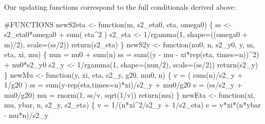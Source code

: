\documentclass[]{article}
\newenvironment{Shaded}{\begin{snugshade}}{\end{snugshade}}
\newcommand{\KeywordTok}[1]{\textcolor[rgb]{0.94,0.87,0.69}{{#1}}}
\newcommand{\DataTypeTok}[1]{\textcolor[rgb]{0.87,0.87,0.75}{{#1}}}
\newcommand{\DecValTok}[1]{\textcolor[rgb]{0.86,0.86,0.80}{{#1}}}
\newcommand{\StringTok}[1]{\textcolor[rgb]{0.80,0.58,0.58}{{#1}}}
\newcommand{\CommentTok}[1]{\textcolor[rgb]{0.50,0.62,0.50}{{#1}}}
\newcommand{\NormalTok}[1]{\textcolor[rgb]{0.80,0.80,0.80}{{#1}}}
\begin{document}
Our updating functions correspond to the full conditionals derived
above:

\begin{Shaded}
\begin{Highlighting}[]
\CommentTok{#FUNCTIONS}
\NormalTok{newS2eta <-}\StringTok{ }\NormalTok{function(m, s2_eta0, eta, omega0)}
\NormalTok{\{}
  \NormalTok{ss <-}\StringTok{ }\NormalTok{s2_eta0*omega0 +}\StringTok{ }\KeywordTok{sum}\NormalTok{( eta^}\DecValTok{2} \NormalTok{)}
  \NormalTok{s2_eta <-}\StringTok{ }\DecValTok{1}\NormalTok{/}\KeywordTok{rgamma}\NormalTok{(}\DecValTok{1}\NormalTok{, }\DataTypeTok{shape=}\NormalTok{((omega0 +}\StringTok{ }\NormalTok{m)/}\DecValTok{2}\NormalTok{), }\DataTypeTok{scale=}\NormalTok{(ss/}\DecValTok{2}\NormalTok{))}
  \KeywordTok{return}\NormalTok{(s2_eta)}
\NormalTok{\}}
\NormalTok{newS2y <-}\StringTok{ }\NormalTok{function(nu0, n, s2_y0, y, m, eta, xi, mu)}
\NormalTok{\{}
  \NormalTok{nun =}\StringTok{ }\NormalTok{nu0 +}\StringTok{ }\KeywordTok{sum}\NormalTok{(n)}
  \NormalTok{ss =}\StringTok{ }\KeywordTok{sum}\NormalTok{((y -}\StringTok{ }\NormalTok{mu -}\StringTok{ }\NormalTok{xi*}\KeywordTok{rep}\NormalTok{(eta, }\DataTypeTok{times=}\NormalTok{n))^}\DecValTok{2}\NormalTok{) +}\StringTok{ }\NormalTok{nu0*s2_y0}
  \NormalTok{s2_y <-}\StringTok{ }\DecValTok{1}\NormalTok{/}\KeywordTok{rgamma}\NormalTok{(}\DecValTok{1}\NormalTok{, }\DataTypeTok{shape=}\NormalTok{(nun/}\DecValTok{2}\NormalTok{), }\DataTypeTok{scale=}\NormalTok{(ss/}\DecValTok{2}\NormalTok{))}
  \KeywordTok{return}\NormalTok{(s2_y)}
\NormalTok{\}}
\NormalTok{newMu <-}\StringTok{ }\NormalTok{function(y, xi, eta, s2_y, g20, mu0, n)}
\NormalTok{\{}
  \NormalTok{v =}\StringTok{ }\NormalTok{( }\KeywordTok{sum}\NormalTok{(n)/s2_y +}\StringTok{ }\DecValTok{1}\NormalTok{/g20 )}
  \NormalTok{ss =}\StringTok{ }\KeywordTok{sum}\NormalTok{(y-}\KeywordTok{rep}\NormalTok{(eta,}\DataTypeTok{times=}\NormalTok{n)*xi)/s2_y +}\StringTok{ }\NormalTok{mu0/g20}
  \NormalTok{e =}\StringTok{ }\NormalTok{(ss/s2_y +}\StringTok{ }\NormalTok{mu0/g20)}
  \NormalTok{mu =}\StringTok{ }\KeywordTok{rnorm}\NormalTok{(}\DecValTok{1}\NormalTok{, ss/v, }\KeywordTok{sqrt}\NormalTok{(}\DecValTok{1}\NormalTok{/v))}
  \KeywordTok{return}\NormalTok{(mu)}
\NormalTok{\}}
\NormalTok{newEta <-}\StringTok{ }\NormalTok{function(xi, mu, ybar, n, s2_y, s2_eta)}
\NormalTok{\{}
  \NormalTok{v =}\StringTok{ }\DecValTok{1}\NormalTok{/(n*xi^}\DecValTok{2}\NormalTok{/s2_y +}\StringTok{ }\DecValTok{1}\NormalTok{/s2_eta)}
  \NormalTok{e =}\StringTok{ }\NormalTok{v*xi*(n*ybar -}\StringTok{ }\NormalTok{mu*n)/s2_y}

\end{Highlighting}
\end{Shaded}
\end{document}

